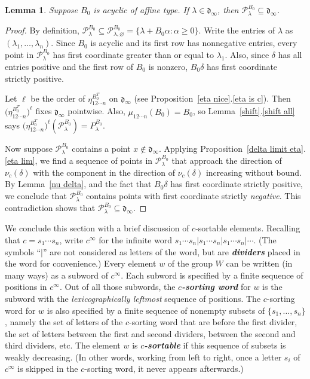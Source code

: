 \documentclass{amsart}
\newtheorem{lemma}[proposition]{Lemma}
\theoremstyle{definition}
\theoremstyle{remark}
\numberwithin{equation}{section}
\newcommand{\newword}[1]{\textbf{\emph{#1}}}
\newcommand{\set}[1]{{\lbrace #1 \rbrace}}
\newcommand{\0}{{\mathbf{0}}}
\renewcommand{\P}{\mathcal{P}}
\renewcommand{\d}{{\mathfrak d}}
\begin{document}
\begin{lemma}\label{P in dinf}
Suppose $B_0$ is acyclic of affine type.
If $\lambda\in\d_\infty$, then $\P^{B_0}_\lambda\subseteq\d_\infty$.
\end{lemma}
\begin{proof}
By definition, $\P^{B_0}_\lambda\subseteq\P^{B_0}_{\lambda,\varnothing}=\set{\lambda+B_0\alpha:\alpha\ge0}$.
Write the entries of $\lambda$ as $(\lambda_1,\ldots,\lambda_n)$.
Since $B_0$ is acyclic and its first row has nonnegative entries, every point in $\P^{B_0}_\lambda$ has first coordinate greater than or equal to $\lambda_1$.
Also, since $\delta$ has all entries positive and the first row of $B_0$ is nonzero, $B_0\delta$ has first coordinate strictly positive.

Let $\ell$ be the order of $\eta^{B_0^T}_{12\cdots n}$ on $\d_\infty$ (see Proposition~\ref{eta nice}.\ref{eta is c}).
Then $\bigl(\eta^{B_0^T}_{12\cdots n}\bigr)^\ell$ fixes $\d_\infty$ pointwise.
Also, $\mu_{12\cdots n}(B_0)=B_0$, so Lemma~\ref{shift}.\ref{shift all} says ${\bigl(\eta^{B_0^T}_{12\cdots n}\bigr)^\ell(\P_\lambda^{B_0})=P_\lambda^{B_0}}$.

Now suppose $\P^{B_0}_\lambda$ contains a point $x\not\in\d_\infty$.
Applying Proposition~\ref{delta limit eta}.\ref{eta lim}, we find a sequence of points in $\P^{B_0}_\lambda$ that approach the direction of $\nu_c(\delta)$ with the component in the direction of $\nu_c(\delta)$ increasing without bound.
By Lemma~\ref{nu delta}, and the fact that $B_0\delta$ has first coordinate strictly positive, we conclude that $\P^{B_0}_\lambda$ contains points with first coordinate strictly \emph{negative}.
This contradiction shows that $\P^{B_0}_\lambda\subseteq\d_\infty$.
\end{proof}

We conclude this section with a brief discussion of $c$-sortable elements.  
Recalling that $c=s_1\cdots s_n$, write $c^\infty$ for the infinite word $s_1\cdots s_n|s_1\cdots s_n|s_1\cdots s_n|\cdots$.
(The symbols ``$|$'' are not considered as letters of the word, but are \newword{dividers} placed in the word for convenience.)
Every element $w$ of the group $W$ can be written (in many ways) as a subword of $c^\infty$.
Each subword is specified by a finite sequence of positions in $c^\infty$.
Out of all those subwords, the \newword{$c$-sorting word} for $w$ is the subword with the \emph{lexicographically leftmost} sequence of positions.
The $c$-sorting word for $w$ is also specified by a finite sequence of nonempty subsets of $\set{s_1,\ldots,s_n}$, namely the set of letters of the $c$-sorting word that are before the first divider, the set of letters between the first and second dividers, between the second and third dividers, etc.
The element $w$ is \newword{$c$-sortable} if this sequence of subsets is weakly decreasing.
(In other words, working from left to right, once a letter $s_i$ of $c^\infty$ is skipped in the $c$-sorting word, it never appears afterwards.)
\end{document}
